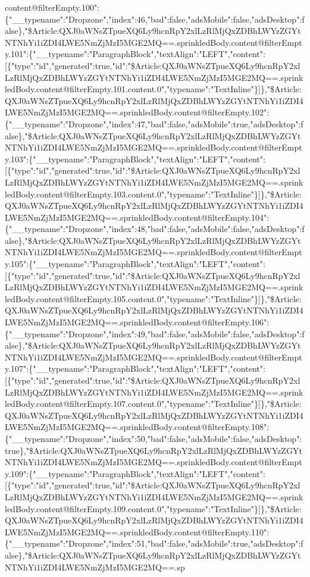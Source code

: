 content@filterEmpty.100":\{"\_\_typename":"Dropzone","index":46,"bad":false,"adsMobile":false,"adsDesktop":false\},"\$Article:QXJ0aWNsZTpueXQ6Ly9hcnRpY2xlLzRlMjQxZDBhLWYzZGYtNTNhYi1iZDI4LWE5NmZjMzI5MGE2MQ==.sprinkledBody.content@filterEmpty.101":\{"\_\_typename":"ParagraphBlock","textAlign":"LEFT","content":{[}\{"type":"id","generated":true,"id":"\$Article:QXJ0aWNsZTpueXQ6Ly9hcnRpY2xlLzRlMjQxZDBhLWYzZGYtNTNhYi1iZDI4LWE5NmZjMzI5MGE2MQ==.sprinkledBody.content@filterEmpty.101.content.0","typename":"TextInline"\}{]}\},"\$Article:QXJ0aWNsZTpueXQ6Ly9hcnRpY2xlLzRlMjQxZDBhLWYzZGYtNTNhYi1iZDI4LWE5NmZjMzI5MGE2MQ==.sprinkledBody.content@filterEmpty.102":\{"\_\_typename":"Dropzone","index":47,"bad":false,"adsMobile":true,"adsDesktop":false\},"\$Article:QXJ0aWNsZTpueXQ6Ly9hcnRpY2xlLzRlMjQxZDBhLWYzZGYtNTNhYi1iZDI4LWE5NmZjMzI5MGE2MQ==.sprinkledBody.content@filterEmpty.103":\{"\_\_typename":"ParagraphBlock","textAlign":"LEFT","content":{[}\{"type":"id","generated":true,"id":"\$Article:QXJ0aWNsZTpueXQ6Ly9hcnRpY2xlLzRlMjQxZDBhLWYzZGYtNTNhYi1iZDI4LWE5NmZjMzI5MGE2MQ==.sprinkledBody.content@filterEmpty.103.content.0","typename":"TextInline"\}{]}\},"\$Article:QXJ0aWNsZTpueXQ6Ly9hcnRpY2xlLzRlMjQxZDBhLWYzZGYtNTNhYi1iZDI4LWE5NmZjMzI5MGE2MQ==.sprinkledBody.content@filterEmpty.104":\{"\_\_typename":"Dropzone","index":48,"bad":false,"adsMobile":false,"adsDesktop":false\},"\$Article:QXJ0aWNsZTpueXQ6Ly9hcnRpY2xlLzRlMjQxZDBhLWYzZGYtNTNhYi1iZDI4LWE5NmZjMzI5MGE2MQ==.sprinkledBody.content@filterEmpty.105":\{"\_\_typename":"ParagraphBlock","textAlign":"LEFT","content":{[}\{"type":"id","generated":true,"id":"\$Article:QXJ0aWNsZTpueXQ6Ly9hcnRpY2xlLzRlMjQxZDBhLWYzZGYtNTNhYi1iZDI4LWE5NmZjMzI5MGE2MQ==.sprinkledBody.content@filterEmpty.105.content.0","typename":"TextInline"\}{]}\},"\$Article:QXJ0aWNsZTpueXQ6Ly9hcnRpY2xlLzRlMjQxZDBhLWYzZGYtNTNhYi1iZDI4LWE5NmZjMzI5MGE2MQ==.sprinkledBody.content@filterEmpty.106":\{"\_\_typename":"Dropzone","index":49,"bad":false,"adsMobile":false,"adsDesktop":false\},"\$Article:QXJ0aWNsZTpueXQ6Ly9hcnRpY2xlLzRlMjQxZDBhLWYzZGYtNTNhYi1iZDI4LWE5NmZjMzI5MGE2MQ==.sprinkledBody.content@filterEmpty.107":\{"\_\_typename":"ParagraphBlock","textAlign":"LEFT","content":{[}\{"type":"id","generated":true,"id":"\$Article:QXJ0aWNsZTpueXQ6Ly9hcnRpY2xlLzRlMjQxZDBhLWYzZGYtNTNhYi1iZDI4LWE5NmZjMzI5MGE2MQ==.sprinkledBody.content@filterEmpty.107.content.0","typename":"TextInline"\}{]}\},"\$Article:QXJ0aWNsZTpueXQ6Ly9hcnRpY2xlLzRlMjQxZDBhLWYzZGYtNTNhYi1iZDI4LWE5NmZjMzI5MGE2MQ==.sprinkledBody.content@filterEmpty.108":\{"\_\_typename":"Dropzone","index":50,"bad":false,"adsMobile":false,"adsDesktop":true\},"\$Article:QXJ0aWNsZTpueXQ6Ly9hcnRpY2xlLzRlMjQxZDBhLWYzZGYtNTNhYi1iZDI4LWE5NmZjMzI5MGE2MQ==.sprinkledBody.content@filterEmpty.109":\{"\_\_typename":"ParagraphBlock","textAlign":"LEFT","content":{[}\{"type":"id","generated":true,"id":"\$Article:QXJ0aWNsZTpueXQ6Ly9hcnRpY2xlLzRlMjQxZDBhLWYzZGYtNTNhYi1iZDI4LWE5NmZjMzI5MGE2MQ==.sprinkledBody.content@filterEmpty.109.content.0","typename":"TextInline"\}{]}\},"\$Article:QXJ0aWNsZTpueXQ6Ly9hcnRpY2xlLzRlMjQxZDBhLWYzZGYtNTNhYi1iZDI4LWE5NmZjMzI5MGE2MQ==.sprinkledBody.content@filterEmpty.110":\{"\_\_typename":"Dropzone","index":51,"bad":false,"adsMobile":true,"adsDesktop":false\},"\$Article:QXJ0aWNsZTpueXQ6Ly9hcnRpY2xlLzRlMjQxZDBhLWYzZGYtNTNhYi1iZDI4LWE5NmZjMzI5MGE2MQ==.sp
